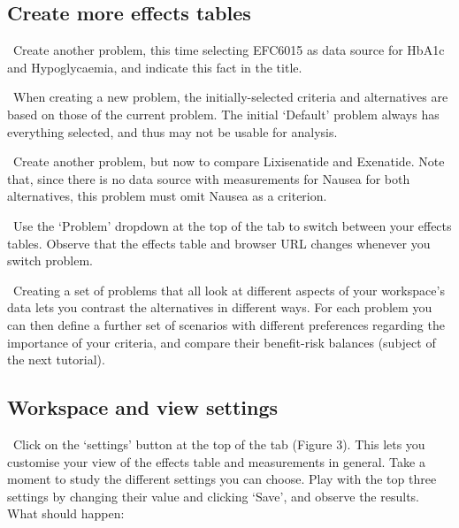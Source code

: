 \documentclass[00_mcda_tutorial.tex]{subfiles}
\begin{document}
\subsection*{Create more effects tables}
\noindent \leftpointright \, Create another problem, this time selecting EFC6015 as data source for HbA1c and Hypoglycaemia, and indicate this fact in the title.
\newline

\noindent \faLightbulbO \, When creating a new problem, the initially-selected criteria and alternatives are based on those of the current problem. The initial ‘Default’ problem always has everything selected, and thus may not be usable for analysis.
\newline

\noindent \leftpointright \, Create another problem, but now to compare Lixisenatide and Exenatide. Note that, since there is no data source with measurements for Nausea for both alternatives, this problem must omit Nausea as a criterion.
\newline

\noindent \leftpointright \, Use the ‘Problem’ dropdown at the top of the tab to switch between your effects tables. Observe that the effects table and browser URL changes whenever you switch problem.
\newline

\noindent \faGraduationCap \, Creating a set of problems that all look at different aspects of your workspace’s data lets you contrast the alternatives in different ways. For each problem you can then define a further set of scenarios with different preferences regarding the importance of your criteria, and compare their benefit-risk balances (subject of the next tutorial).

\subsection*{Workspace and view settings}

\noindent \leftpointright \, Click on the ‘settings’ button at the top of the tab (Figure 3). This lets you customise your view of the effects table and measurements in general. Take a moment to study the different settings you can choose. Play with the top three settings by changing their value and clicking ‘Save’, and observe the results. What should happen:
\end{document}
